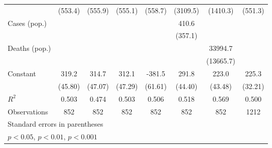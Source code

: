 \documentclass{article}
\begin{document}
{\begin{longtable}{l*{7}{c}}
                &  (553.4)         &  (555.9)         &  (555.1)         &  (558.7)         & (3109.5)         & (1410.3)         &  (551.3)         \\
Cases (pop.)    &                  &                  &                  &                  &    410.6         &                  &                  \\
                &                  &                  &                  &                  &  (357.1)         &                  &                  \\
Deaths (pop.)   &                  &                  &                  &                  &                  &  33994.7         &                  \\
                &                  &                  &                  &                  &                  &(13665.7)         &                  \\
Constant        &    319.2\sym{***}&    314.7\sym{**} &    312.1\sym{**} &   -381.5\sym{**} &    291.8\sym{**} &    223.0\sym{**} &    225.3\sym{***}\\
                &  (45.80)         &  (47.07)         &  (47.29)         &  (61.61)         &  (44.40)         &  (43.48)         &  (32.21)         \\
\hline
\(R^{2}\)       &    0.503         &    0.474         &    0.503         &    0.506         &    0.518         &    0.569         &    0.500         \\
Observations    &      852         &      852         &      852         &      852         &      852         &      852         &     1212         \\
\hline\hline
\multicolumn{8}{l}{\footnotesize Standard errors in parentheses}\\
\multicolumn{8}{l}{\footnotesize \sym{*} \(p<0.05\), \sym{**} \(p<0.01\), \sym{***} \(p<0.001\)}\\
\end{longtable}
}
\end{document}
